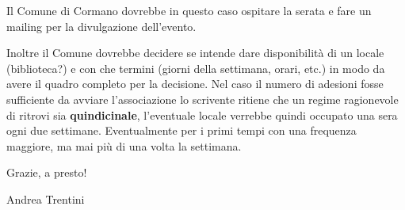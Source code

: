 \documentclass[a4paper,12pt]{article}
\begin{document}
Il Comune di Cormano dovrebbe in questo caso ospitare la serata e fare un mailing per la divulgazione dell'evento.

Inoltre il Comune dovrebbe decidere se intende dare disponibilità di un locale (biblioteca?) e con che termini (giorni della settimana, orari, etc.) in modo da avere il quadro completo per la decisione.
Nel caso il numero di adesioni fosse sufficiente da avviare l'associazione lo scrivente ritiene che un regime ragionevole di ritrovi sia \textbf{quindicinale}, l'eventuale locale verrebbe quindi occupato una sera ogni due settimane. Eventualmente per i primi tempi con una frequenza maggiore, ma mai più di una volta la settimana.




\medskip

\hfill Grazie, a presto!

\hfill Andrea Trentini




\end{document}
